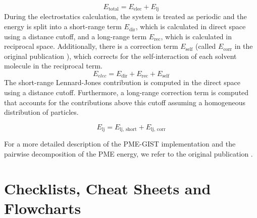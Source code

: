 \documentclass[9pt,tutorial,pubversion]{livecoms}
\begin{document}
\begin{equation}
	E_\text{total} = E_\text{elec} + E_\text{lj}
\end{equation}
During the electrostatics calculation, the system is treated as periodic and the energy is split into a short-range term $E_\text{dir}$, which is calculated in direct space using a distance cutoff, and a long-range term $E_\text{rec}$, which is calculated in reciprocal space.
Additionally, there is a correction term $E_\text{self}$ (called $E_\text{corr}$ in the original publication \cite{Chen2021}), which corrects for the self-interaction of each solvent molecule in the reciprocal term.
\begin{equation}
	E_\textit{elec} = E_\text{dir} + E_\text{rec} + E_\text{self}
\end{equation}
The short-range Lennard-Jones contribution is computed in the direct space using a distance cutoff.
Furthermore, a long-range correction term is computed that accounts for the contributions above this cutoff assuming a homogeneous distribution of particles.

\begin{equation}
	E_\text{lj} = E_\text{lj,\ short} +  E_\text{lj,\ corr}
\end{equation}

For a more detailed description of the PME-GIST implementation and the pairwise decomposition of the PME energy, we refer to the original publication \cite{Chen2021}.
\section{Checklists, Cheat Sheets and Flowcharts} \label{sec:checklists}
\end{document}
